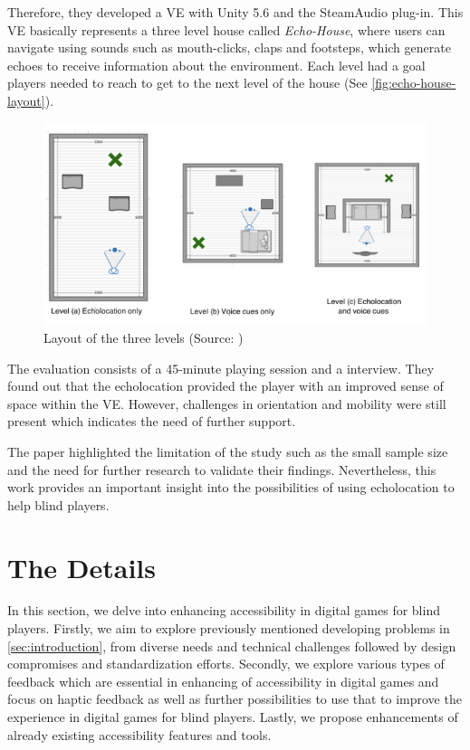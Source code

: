 \documentclass[sigconf,natbib=false,10pt]{acmart}
\begin{document}
	Therefore, they developed a VE with Unity 5.6 and the SteamAudio plug-in.
	This VE basically represents a three level house called \emph{Echo-House}, where users can navigate using sounds such as mouth-clicks, claps and footsteps, which generate echoes to receive information about the environment.
	Each level had a goal players needed to reach to get to the next level of the house (See \autoref{fig:echo-house-layout}).
	
	\begin{figure}[ht]
		\centering
		\includegraphics[scale=0.5]{assets/echo-house-layout.png}
		\caption{Layout of the three levels (Source: \textcite{andrade_echo-house_2018})}
		\label{fig:echo-house-layout}
	\end{figure}

	The evaluation consists of a 45-minute playing session and a interview.
	They found out that the echolocation provided the player with an improved sense of space within the VE.
	However, challenges in orientation and mobility were still present which indicates the need of further support.
	
	The paper highlighted the limitation of the study such as the small sample size and the need for further research to validate their findings.
	Nevertheless, this work provides an important insight into the possibilities of using echolocation to help blind players.
	
	\section{The Details} \label{sec:theDetails}
	In this section, we delve into enhancing accessibility in digital games for blind players.
	Firstly, we aim to explore previously mentioned developing problems in \autoref{sec:introduction}, from diverse needs and technical challenges followed by design compromises and standardization efforts.
	Secondly, we explore various types of feedback which are essential in enhancing of accessibility in digital games and focus on haptic feedback as well as further possibilities to use that to improve the experience in digital games for blind players.
	Lastly, we propose enhancements of already existing accessibility features and tools.
	
\end{document}
